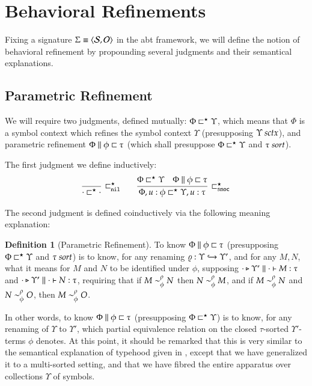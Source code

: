 \documentclass[11pt]{article}
\theoremstyle{definition}
\newtheorem{definition}[thm]{Definition}
\theoremstyle{remark}
\numberwithin{equation}{section}
\def\IModeColorName{MidnightBlue}
\def\OModeColorName{Maroon}
\def\IModeColorName{Black}
\def\OModeColorName{Black}
\newcommand\IMode[1]{{\color{\IModeColorName}{#1}}}
\newcommand\OMode[1]{{\color{\OModeColorName}{#1}}}
\newcommand\Of[2]{\IMode{#1}: \IMode{#2}}
\newcommand\IsSort[1]{\IMode{#1}\ \textit{sort}}
\newcommand\Match[2]{\IMode{#1}\equiv\OMode{#2}}
\newcommand\Sorts{\mathcal{S}}
\newcommand\Operators{\mathcal{O}}
\newcommand\IsSymCtx[1]{\IMode{#1}\ \textit{sctx}}
\newcommand\Pair[2]{\left\langle#1, #2 \right\rangle}
\newcommand\IsAbtUnmoded[5]{
  #1\triangleright%
  #2\parallel%
  #3\vdash%
  #4:\OMode{#5}%
}
\newcommand\IsAbt[5]{\IsAbtUnmoded{\IMode{#1}}{\IMode{#2}}{\IMode{#3}}{\IMode{#4}}{\OMode{#5}}}
\newcommand\Refines[3]{\IMode{#1}\parallel\IMode{#2}\sqsubset\OMode{#3}}
\newcommand\RefinesCtx[2]{\IMode{#1}\sqsubset^\star\OMode{#2}}
\begin{document}
\section{Behavioral Refinements}

Fixing a signature $\Match{\Sigma}{\Pair{\Sorts}{\Operators}}$ in the abt
framework, we will define the notion of behavioral refinement by propounding
several judgments and their semantical explanations.

\subsection{Parametric Refinement}

We will require two judgments, defined mutually: $\RefinesCtx{\Phi}{\Upsilon}$,
which means that $\Phi$ is a symbol context which refines the symbol context
$\Upsilon$ (presupposing $\IsSymCtx{\Upsilon}$), and parametric refinement
$\Refines{\Phi}{\phi}{\tau}$ (which shall presuppose
$\RefinesCtx{\Phi}{\Upsilon}$ and $\IsSort{\tau}$).

\newcommand\RefinesCtxNil{\sqsubset^\star_{\mathtt{nil}}}
\newcommand\RefinesCtxSnoc{\sqsubset^\star_{\mathtt{snoc}}}

The first judgment we define inductively:
\begin{gather*}
  \infer[\RefinesCtxNil]{
    \RefinesCtx{\cdot}{\cdot}
  }{
  }\qquad
  \infer[\RefinesCtxSnoc]{
    \RefinesCtx{\Phi,u:\phi}{\Upsilon,u:\tau}
  }{
    \RefinesCtx{\Phi}{\Upsilon} &
    \Refines{\Phi}{\phi}{\tau}
  }
\end{gather*}

The second judgment is defined coinductively via the following meaning
explanation:
\begin{definition}[Parametric Refinement]
  To know $\Refines{\Phi}{\phi}{\tau}$ (presupposing
  $\RefinesCtx{\Phi}{\Upsilon}$ and $\IsSort{\tau}$) is to know, for any renaming
  $\Of{\varrho}{\Upsilon\hookrightarrow\OMode{\Upsilon'}}$, and for any $M, N$,
  what it means for $M$ and $N$ to be identified under $\phi$, supposing
  $\IsAbt{\cdot}{\Upsilon'}{\cdot}{M}{\tau}$ and
  $\IsAbt{\cdot}{\Upsilon'}{\cdot}{N}{\tau}$, requiring that if
  $\IMode{M}\sim^\rho_\phi\IMode{N}$ then $\IMode{N}\sim^\rho_\phi\IMode{M}$, and if
  $\IMode{M}\sim^\rho_\phi\IMode{N}$ and $\IMode{N}\sim^\rho_\phi\IMode{O}$, then
  $\IMode{M}\sim^\rho_\phi\IMode{O}$.
\end{definition}

In other words, to know $\Refines{\Phi}{\phi}{\tau}$ (presupposing
$\RefinesCtx{\Phi}{\Upsilon}$) is to know, for any renaming of $\Upsilon$ to
$\Upsilon'$, which partial equivalence relation on the closed $\tau$-sorted
$\Upsilon'$-terms $\phi$ denotes. At this point, it should be remarked that
this is very similar to the semantical explanation of typehood given in
\cite{martin-lof:1979}, except that we have generalized it to a multi-sorted
setting, and that we have fibred the entire apparatus over collections
$\Upsilon$ of symbols.
\end{document}
